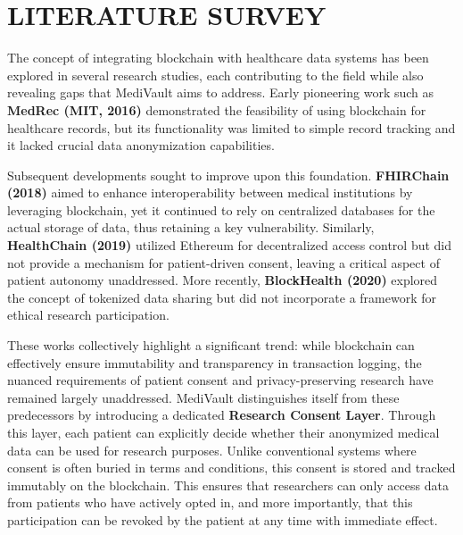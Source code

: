 \chapter{LITERATURE SURVEY}
\label{chap:literature_survey}

The concept of integrating blockchain with healthcare data systems has been explored in several research studies, each contributing to the field while also revealing gaps that MediVault aims to address. Early pioneering work such as \textbf{MedRec (MIT, 2016)} demonstrated the feasibility of using blockchain for healthcare records, but its functionality was limited to simple record tracking and it lacked crucial data anonymization capabilities.

Subsequent developments sought to improve upon this foundation. \textbf{FHIRChain (2018)} aimed to enhance interoperability between medical institutions by leveraging blockchain, yet it continued to rely on centralized databases for the actual storage of data, thus retaining a key vulnerability. Similarly, \textbf{HealthChain (2019)} utilized Ethereum for decentralized access control but did not provide a mechanism for patient-driven consent, leaving a critical aspect of patient autonomy unaddressed. More recently, \textbf{BlockHealth (2020)} explored the concept of tokenized data sharing but did not incorporate a framework for ethical research participation.

These works collectively highlight a significant trend: while blockchain can effectively ensure immutability and transparency in transaction logging, the nuanced requirements of patient consent and privacy-preserving research have remained largely unaddressed. MediVault distinguishes itself from these predecessors by introducing a dedicated \textbf{Research Consent Layer}. Through this layer, each patient can explicitly decide whether their anonymized medical data can be used for research purposes. Unlike conventional systems where consent is often buried in terms and conditions, this consent is stored and tracked immutably on the blockchain. This ensures that researchers can only access data from patients who have actively opted in, and more importantly, that this participation can be revoked by the patient at any time with immediate effect.

